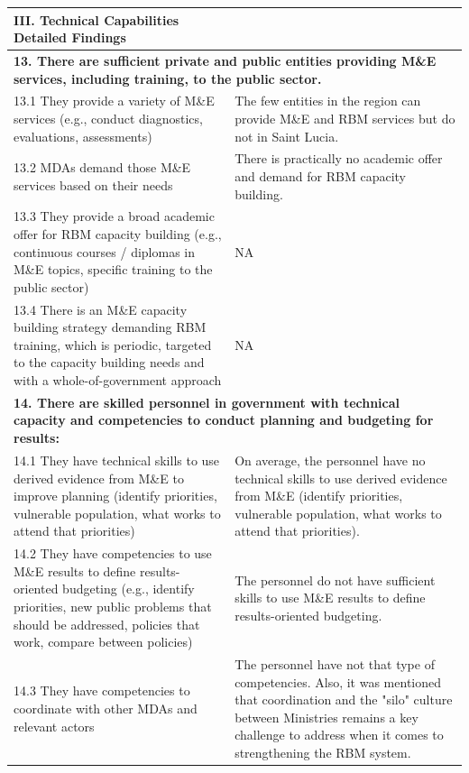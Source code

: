 \documentclass[
  10pt,
]{book}
\begin{document}
\begin{table}
\centering
\begin{tabular}[t]{l|l}
\hline
III. Technical Capabilities Detailed Findings &  \\
\hline
\multicolumn{2}{l}{\textbf{13. There are sufficient private and public entities providing M\&E services, including training, to the public sector.}}\\
\hline
\hspace{1em}13.1 They provide a variety of M\&E services (e.g., conduct diagnostics, evaluations, assessments) & The few entities in the region can provide M\&E and RBM services but do not in Saint Lucia.\\
\hline
\hspace{1em}13.2 MDAs demand those M\&E services based on their needs & There is practically no academic offer and demand for RBM capacity building.\\
\hline
\hspace{1em}13.3 They provide a broad academic offer for RBM capacity building (e.g., continuous courses / diplomas in M\&E topics, specific training to the public sector) & NA\\
\hline
\hspace{1em}13.4 There is an M\&E capacity building strategy demanding RBM training, which is periodic, targeted to the capacity building needs and with a whole-of-government approach & NA\\
\hline
\multicolumn{2}{l}{\textbf{14. There are skilled personnel in government with technical capacity and competencies to conduct planning and budgeting for results:}}\\
\hline
\hspace{1em}14.1 They have technical skills to use derived evidence from M\&E to improve planning (identify priorities, vulnerable population, what works to attend that priorities) & On average, the personnel have no technical skills to use derived evidence from M\&E (identify priorities, vulnerable population, what works to attend that priorities).\\
\hline
\hspace{1em}14.2 They have competencies to use M\&E results to define results-oriented budgeting (e.g., identify priorities, new public problems that should be addressed, policies that work, compare between policies) & The personnel do not have sufficient skills to use M\&E results to define results-oriented budgeting.\\
\hline
\hspace{1em}14.3 They have competencies to coordinate with other MDAs and relevant actors & The personnel have not that type of competencies. Also, it was mentioned that coordination and the "silo" culture between Ministries remains a key challenge to address when it comes to strengthening the RBM system.\\

\end{tabular}
\end{table}
\end{document}
